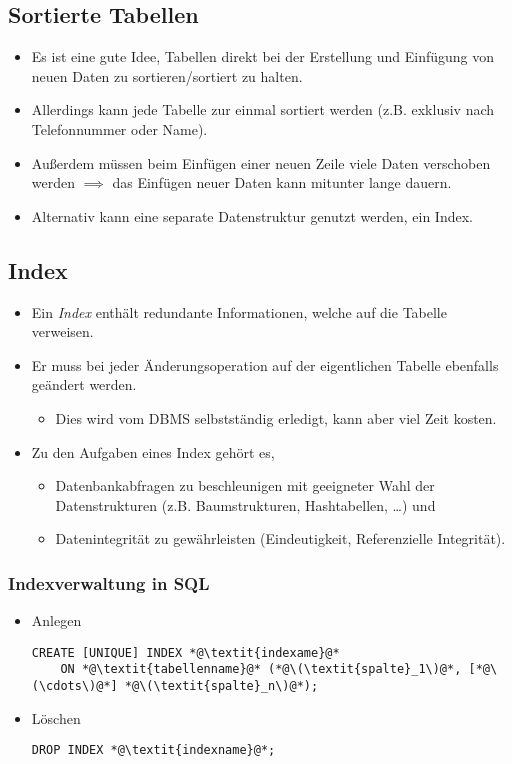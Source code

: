 		\subsection{Sortierte Tabellen} %
			\begin{itemize}
				\item Es ist eine gute Idee, Tabellen direkt bei der Erstellung und Einfügung von neuen Daten zu sortieren/sortiert zu halten.
				\item Allerdings kann jede Tabelle zur einmal sortiert werden (z.B. exklusiv nach Telefonnummer oder Name).
				\item Außerdem müssen beim Einfügen einer neuen Zeile viele Daten verschoben werden \( \implies \) das Einfügen neuer Daten kann mitunter lange dauern.
				\item Alternativ kann eine separate Datenstruktur genutzt werden, ein Index.
			\end{itemize}

		\subsection{Index} %
			\begin{itemize}
				\item Ein \textit{Index} enthält redundante Informationen, welche auf die Tabelle verweisen.
				\item Er muss bei jeder Änderungsoperation auf der eigentlichen Tabelle ebenfalls geändert werden.
					\begin{itemize}
						\item Dies wird vom DBMS selbstständig erledigt, kann aber viel Zeit kosten.
					\end{itemize}
				\item Zu den Aufgaben eines Index gehört es,
					\begin{itemize}
						\item Datenbankabfragen zu beschleunigen mit geeigneter Wahl der Datenstrukturen (z.B. Baumstrukturen, Hashtabellen, \dots) und
						\item Datenintegrität zu gewährleisten (Eindeutigkeit, Referenzielle Integrität).
					\end{itemize}
			\end{itemize}

			\subsubsection{Indexverwaltung in SQL} %
				\begin{itemize}
					\item Anlegen
						\begin{lstlisting}
CREATE [UNIQUE] INDEX *@\textit{indexame}@*
	ON *@\textit{tabellenname}@* (*@\(\textit{spalte}_1\)@*, [*@\(\cdots\)@*] *@\(\textit{spalte}_n\)@*);
	                    \end{lstlisting}
					\item Löschen
						\begin{lstlisting}
DROP INDEX *@\textit{indexname}@*;
	                	\end{lstlisting}
				\end{itemize}

